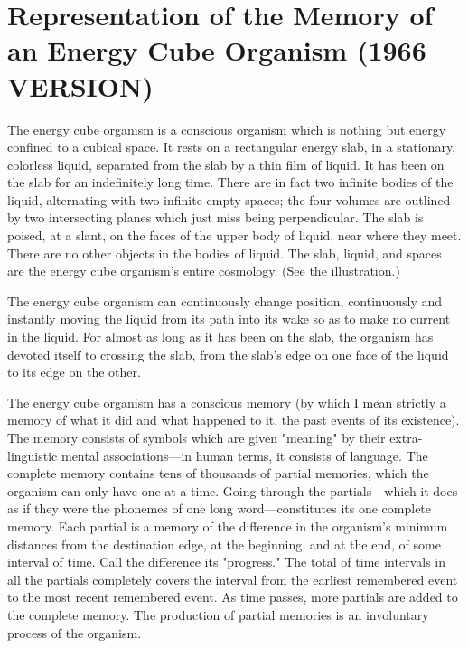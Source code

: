 \documentclass[10pt,twoside,draft]{memoir}
\begin{document}
{{\chapter{Representation of the Memory of an Energy Cube Organism (1966 VERSION)}


The energy cube organism is a conscious organism which is nothing but 
energy confined to a cubical space. It rests on a rectangular energy slab, in a 
stationary, colorless liquid, separated from the slab by a thin film of liquid. 
It has been on the slab for an indefinitely long time. There are in fact two 
infinite bodies of the liquid, alternating with two infinite empty spaces; the 
four volumes are outlined by two intersecting planes which just miss being 
perpendicular. The slab is poised, at a slant, on the faces of the upper body 
of liquid, near where they meet. There are no other objects in the bodies of 
liquid. The slab, liquid, and spaces are the energy cube organism's entire 
cosmology. (See the illustration.) 


The energy cube organism can continuously change position, 
continuously and instantly moving the liquid from its path into its wake so 
as to make no current in the liquid. For almost as long as it has been on the 
slab, the organism has devoted itself to crossing the slab, from the slab's edge 
on one face of the liquid to its edge on the other. 

The energy cube organism has a conscious memory (by which I mean 
strictly a memory of what it did and what happened to it, the past events of 
its existence). The memory consists of symbols which are given "meaning" 
by their extra-linguistic mental associations---in human terms, it consists of 
language. The complete memory contains tens of thousands of partial 
memories, which the organism can only have one at a time. Going through 
the partials---which it does as if they were the phonemes of one long 
word---constitutes its one complete memory. Each partial is a memory of the 
difference in the organism's minimum distances from the destination edge, at 
the beginning, and at the end, of some interval of time. Call the difference its 
"progress." The total of time intervals in all the partials completely covers 
the interval from the earliest remembered event to the most recent 
remembered event. As time passes, more partials are added to the complete 
memory. The production of partial memories is an involuntary process of 
the organism. 

}}
\end{document}
